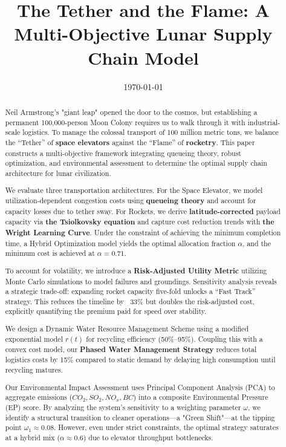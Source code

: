 \documentclass{mcmthesis}
\title{The Tether and the Flame: A Multi-Objective Lunar Supply Chain Model}
\date{\today}
\begin{document}
\nocite{*} 
\begin{abstract}
\par Neil Armstrong’s "giant leap" opened the door to the cosmos, but establishing a permanent 100,000-person Moon Colony requires us to walk through it with industrial-scale logistics. To manage the colossal transport of 100 million metric tons, we balance the “Tether” of \textbf{space elevators} against the “Flame” of \textbf{rocketry}. This paper constructs a multi-objective framework integrating queueing theory, robust optimization, and environmental assessment to determine the optimal supply chain architecture for lunar civilization.

We evaluate three transportation architectures. For the Space Elevator, we model utilization-dependent congestion costs using \textbf{queueing theory} and account for capacity losses due to tether sway. For Rockets, we derive \textbf{latitude-corrected} payload capacity via \textbf{the Tsiolkovsky equation} and capture cost reduction trends with \textbf{the Wright Learning Curve}. Under the constraint of achieving the minimum completion time, a Hybrid Optimization model yields the optimal allocation fraction $\alpha$, and the minimum cost is achieved at $\alpha = 0.71$.

To account for volatility, we introduce a \textbf{Risk-Adjusted Utility Metric} utilizing Monte Carlo simulations to model failures and groundings. Sensitivity analysis reveals a strategic trade-off: expanding rocket capacity five-fold unlocks a “Fast Track” strategy. This reduces the timeline by ~33\% but doubles the risk-adjusted cost, explicitly quantifying the premium paid for speed over stability.

We design a Dynamic Water Resource Management Scheme using a modified exponential model $r(t)$ for recycling efficiency (50\%--95\%). Coupling this with a convex cost model, our \textbf{Phased Water Management Strategy} reduces total logistics costs by 15\% compared to static demand by delaying high consumption until recycling matures.

Our Environmental Impact Assessment uses Principal Component Analysis (PCA) to aggregate emissions ($CO_2, SO_2, NO_x, BC$) into a composite Environmental Pressure (EP) score. By analyzing the system's sensitivity to a weighting parameter $\omega$, we identify a structural transition to cleaner operations—a "Green Shift"—at the tipping point $\omega_1 \approx 0.08$. However, even under strict constraints, the optimal strategy saturates at a hybrid mix ($\alpha \approx 0.6$) due to elevator throughput bottlenecks.


\end{abstract}
\end{document}
